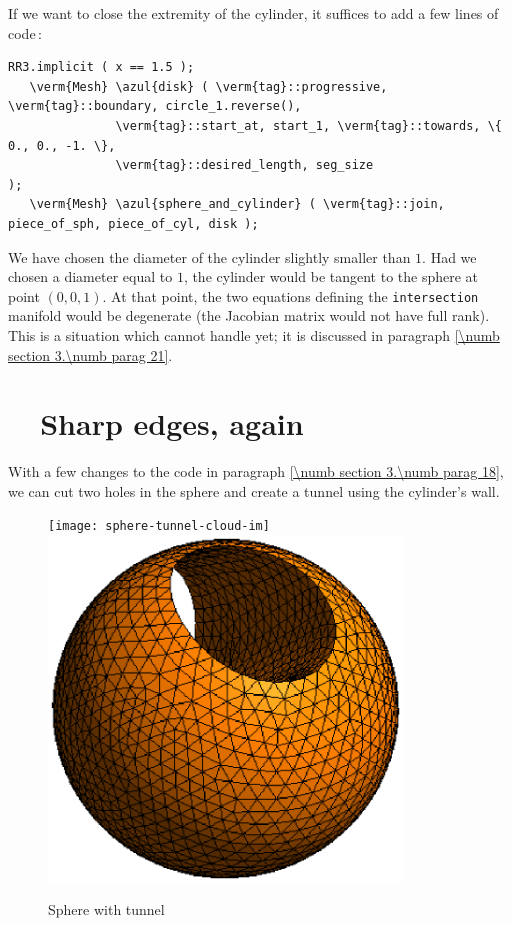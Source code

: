 If we want to close the extremity of the cylinder, it suffices to add a few lines of code$\,$:

\begin{Verbatim}[commandchars=\\\{\},formatcom=\small\tt,
   baselinestretch=0.94,framesep=2mm                     ]
   RR3.implicit ( x == 1.5 );
   \verm{Mesh} \azul{disk} ( \verm{tag}::progressive, \verm{tag}::boundary, circle_1.reverse(),
               \verm{tag}::start_at, start_1, \verm{tag}::towards, \{ 0., 0., -1. \},
               \verm{tag}::desired_length, seg_size                          );
   \verm{Mesh} \azul{sphere_and_cylinder} ( \verm{tag}::join, piece_of_sph, piece_of_cyl, disk );
\end{Verbatim}

We have chosen the diameter of the cylinder slightly smaller than $1$.
Had we chosen a diameter equal to $1$, the cylinder would be tangent to the sphere at point
$ (0,0,1) $.
At that point, the two equations defining the {\small\tt intersection} manifold would be
degenerate (the Jacobian matrix would not have full rank).
This is a situation which {\maniFEM} cannot handle yet; it is discussed in paragraph
\ref{\numb section 3.\numb parag 21}.


\section{~~Sharp edges, again}\label{\numb section 3.\numb parag 19}

With a few changes to the code in paragraph \ref{\numb section 3.\numb parag 18},
we can cut two holes in the sphere and create a tunnel using the cylinder's wall.
\medskip

\begin{figure}[ht] \centering
\if{}
 \texttt{[image: sphere-tunnel-cloud-im]}
\else
 \includegraphics[width=94mm]{sphere-tunnel-low-res}
\fi
  \caption{Sphere with tunnel}
  \label{\numb section 3.\numb fig 7}
\end{figure}

